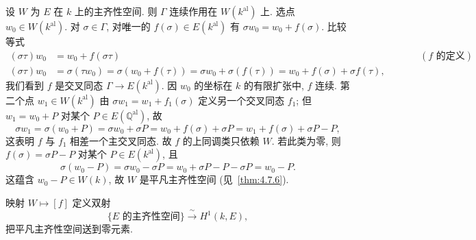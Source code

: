 设 $W$ 为 $E$ 在 $k$ 上的主齐性空间. 则 $\Gamma$ 连续作用在 $W(k^{\mathrm{al}})$ 上. 选点 $w_0\in W(k^{\mathrm{al}})$. 对 $\sigma\in\Gamma$, 对唯一的 $f(\sigma)\in E(k^{\mathrm{al}})$ 有 $\sigma w_0 = w_0 + f(\sigma)$. 比较等式
\begin{align*}
(\sigma\tau)w_0 &= w_0 + f(\sigma\tau) && \qquad (f \text{ 的定义})\\
(\sigma\tau)w_0 &= \sigma(\tau w_0) = \sigma(w_0 + f(\tau)) = \sigma w_0 + \sigma(f(\tau)) = w_0 + f(\sigma) + \sigma f(\tau),
\end{align*}
我们看到 $f$ 是交叉同态 $\Gamma\to E(k^{\mathrm{al}})$. 因 $w_0$ 的坐标在 $k$ 的有限扩张中, $f$ 连续. 第二个点 $w_1\in W(k^{\mathrm{al}})$ 由 $\sigma w_1 = w_1 + f_1(\sigma)$ 定义另一个交叉同态 $f_1$; 但 $w_1 = w_0 + P$ 对某个 $P\in E(\mathbb{Q}^{\mathrm{al}})$, 故
\[
\sigma w_1 = \sigma(w_0 + P) = \sigma w_0 + \sigma P = w_0 + f(\sigma) + \sigma P = w_1 + f(\sigma) + \sigma P - P,
\]
这表明 $f$ 与 $f_1$ 相差一个主交叉同态. 故 $f$ 的上同调类只依赖 $W$. 若此类为零, 则 $f(\sigma) = \sigma P - P$ 对某个 $P\in E(k^{\mathrm{al}})$, 且
\[
\sigma(w_0 - P) = \sigma w_0 - \sigma P = w_0 + \sigma P - P - \sigma P = w_0 - P.
\]
这蕴含 $w_0 - P\in W(k)$, 故 $W$ 是平凡主齐性空间 (见~\ref{thm:4.7.6}).

\begin{theorem} \label{thm:4.7.8} 
映射 $W\mapsto[f]$ 定义双射
\begin{equation} \label{eq:35}
\{E \text{ 的主齐性空间}\}\xrightarrow{\ \sim\ }H^1(k, E),
\tag{35}
\end{equation}
把平凡主齐性空间送到零元素.
\end{theorem}

